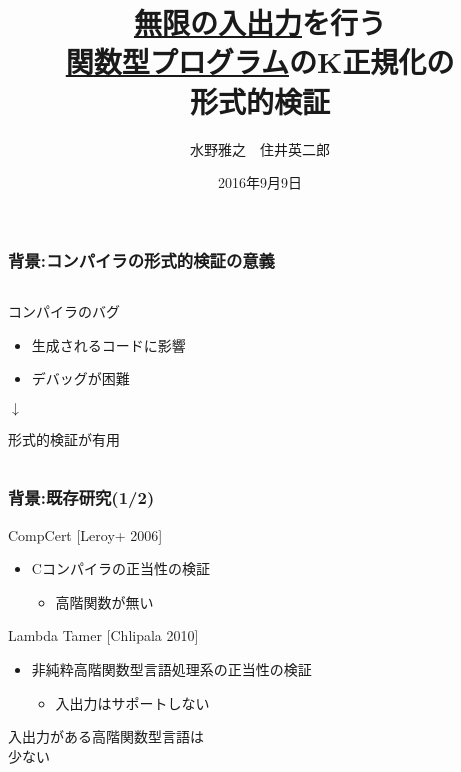 \documentclass[dvipdfmx,cjk,xcolor=dvipsnames,envcountsect,notheorems,12pt]{beamer}
\title{\underline{無限の入出力}を行う\\ \underline{関数型プログラム}のK正規化の\\形式的検証}
\author{水野雅之　住井英二郎}
\institute[東北大学　住井・松田研]{東北大学 大学院情報科学研究科}%
\date{2016年9月9日}
\theoremstyle{definition}
\begin{document}
\frame[plain]{\titlepage}%

\begin{frame}
	\frametitle{背景:コンパイラの形式的検証の意義}
	\begin{columns}
		\begin{column}{0.6\textwidth}
			\LARGE コンパイラのバグ
			\begin{itemize}
				\item 生成されるコードに影響
				\item デバッグが困難
			\end{itemize}

			\vfill

			\begin{center}
				$\downarrow$
			\end{center}

			\vfill

			形式的検証が有用
		\end{column}
	\end{columns}
\end{frame}

\begin{frame}
	\frametitle{背景:既存研究(1/2)}
	\LARGE CompCert [Leroy+ 2006]
	\begin{itemize}
		\item Cコンパイラの正当性の検証
			\begin{itemize}
				\item 高階関数が無い
			\end{itemize}
	\end{itemize}

	Lambda Tamer [Chlipala 2010]
	\begin{itemize}
		\item 非純粋高階関数型言語処理系の正当性の検証
			\begin{itemize}
				\item 入出力はサポートしない
			\end{itemize}
	\end{itemize}

	\vfill

	入出力がある高階関数型言語は\\
	少ない
\end{frame}
\end{document}
